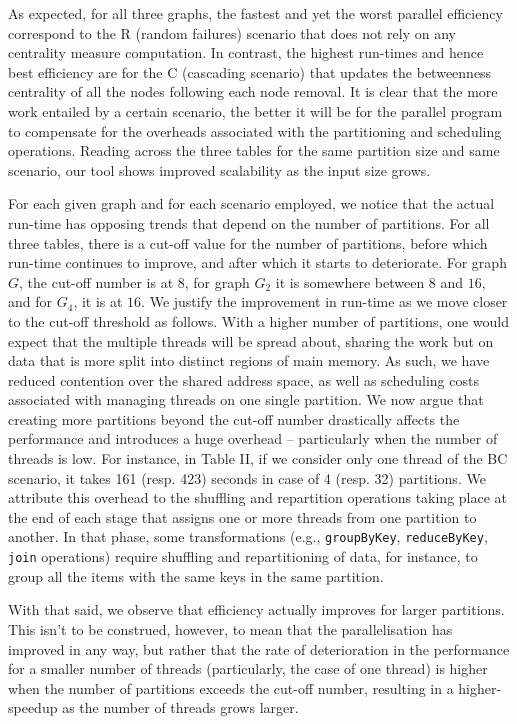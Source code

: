 As expected, for all three graphs, the fastest and yet the worst parallel efficiency correspond to the R (random failures) scenario that does not rely on any centrality measure computation. In contrast, the highest run-times and hence best efficiency are for the C (cascading scenario) that updates the betweenness centrality of all the nodes following each node removal. It is clear that the more work entailed by a certain scenario, the better it will be for the parallel program to compensate for the overheads associated with the partitioning and scheduling operations. Reading across the three tables for the same partition size and same scenario, our tool shows improved scalability as the input size grows. 

For each given graph and for each scenario employed, we notice that the actual run-time has opposing trends that depend on the number of partitions. For all three tables, there is a cut-off value for the number of partitions, before which run-time continues to improve, and after which it starts to deteriorate. For graph $G$, the cut-off number is at $8$, for graph $G_2$ it is somewhere between $8$ and $16$, and for $G_4$, it is at $16$. We justify the improvement in run-time as we move closer to the cut-off threshold as follows. With a higher number of partitions, one would expect that the multiple threads will be spread about, sharing the work but on data that is more split into distinct regions of main memory. As such, we have reduced contention over the shared address space, as well as scheduling costs associated with managing threads on one single partition. We now argue that creating more partitions beyond the cut-off number drastically affects the performance and introduces a huge overhead -- particularly when the number of threads is low. For instance, in Table II, if we consider only one thread of the BC scenario, it takes 161 (resp. 423) seconds in case of 4 (resp. 32) partitions. We attribute this overhead to the shuffling and repartition operations taking place at the end of each stage that assigns one or more threads from one partition to another. In that phase, some transformations (e.g., \texttt{groupByKey}, \texttt{reduceByKey}, \texttt{join} operations) require shuffling and repartitioning of data, for instance, to group all the items with the same keys in the same partition. 

With that said, we observe that efficiency actually improves for larger partitions. This isn't to be construed, however, to mean that the parallelisation has improved in any way, but rather that the rate of deterioration in the performance for a smaller number of threads (particularly, the case of one thread) is higher when the number of partitions exceeds the cut-off number, resulting in a higher-speedup as the number of threads grows larger. 

